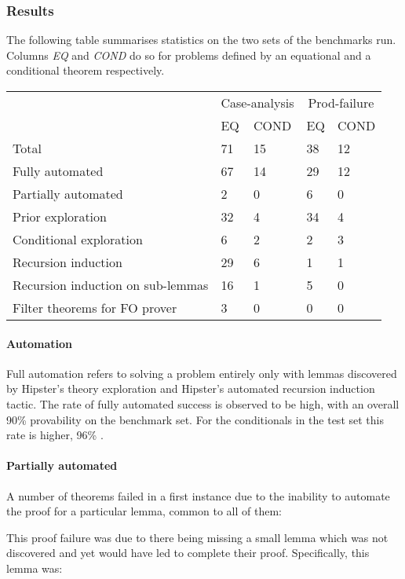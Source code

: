 \subsubsection{Results}

The following table summarises statistics on the two sets of the benchmarks run.
%
Columns \emph{EQ} and \emph{COND} do so for problems defined by an equational and a conditional theorem respectively.

\begin{tabularx}{\textwidth}{l | X X | X X}
  & \multicolumn{2}{c|}{Case-analysis} & \multicolumn{2}{c}{Prod-failure} \\
  &  EQ & COND & EQ & COND \\
  \hline
  Total & 71 & 15 & 38 & 12 \\
  \hline
  Fully automated & 67 & 14 & 29 & 12 \\
  Partially automated & 2 & 0 & 6 & 0 \\
  \hline
  Prior exploration & 32 & 4 & 34 & 4 \\
  Conditional exploration & 6 & 2 & 2 & 3 \\
  \hline
  Recursion induction & 29 & 6 & 1 & 1 \\
  Recursion induction on sub-lemmas & 16 & 1 & 5 & 0 \\
  \hline
  Filter theorems for FO prover & 3 & 0 & 0 & 0 \\
\end{tabularx}

\paragraph{Automation}
%
Full automation refers to solving a problem entirely only with lemmas discovered by Hipster's theory exploration and Hipster's automated recursion induction tactic. The rate of fully automated success is observed to be high, with an overall 90\%
  provability on the benchmark set. For the conditionals in the test set this rate is higher, 96\%
 .

\paragraph{Partially automated}

A number of theorems failed in a first instance due to the inability to automate the proof for a particular lemma, common to all of them:


This proof failure was due to there being missing a small lemma which was not discovered and yet would have led to complete their proof. Specifically, this lemma was:


